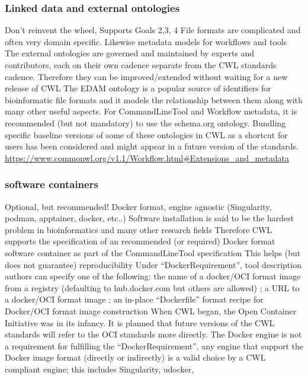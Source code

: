 \subsubsection{Linked data and external ontologies}

Don’t reinvent the wheel, Supports Goals 2,3, 4
File formats are complicated and often very domain specific. Likewise metadata models for workflows and tools
The external ontologies are governed and maintained by experts and contributors, each on their own cadence separate from the CWL standards cadence. Therefore they can be improved/extended without waiting for a new release of CWL
The EDAM ontology is a popular source of identifiers for bioinformatic file formats and it models the relationship between them along with many other useful aspects. For CommandLineTool and Workflow metadata, it is recommended (but not mandatory) to use the schema.org ontology.
Bundling specific baseline versions of some of these ontologies in CWL as a shortcut for users has been considered and might appear in a future version of the standards.
\url{https://www.commonwl.org/v1.1/Workflow.html#Extensions_and_metadata}

\subsubsection{software containers}
Optional, but recommended! Docker format, engine agnostic (Singularity, podman, apptainer, docker, etc..)
Software installation is said to be the hardest problem in bioinformatics and many other research fields
Therefore CWL supports the specification of an recommended (or required) Docker format software container as part of the CommandLineTool specification
This helps (but does not guarantee) reproducibility
Under “DockerRequirement”, tool description authors can specify one of the following: the name of a docker/OCI format image from a registry (defaulting to hub.docker.com but others are allowed) ; a URL to a docker/OCI format image ; an in-place “Dockerfile” format recipe for Docker/OCI format image construction
When CWL began, the Open Container Initiative was in its infancy. It is planned that future versions of the CWL standards will refer to the OCI standards more directly. The Docker engine is not a requirement for fulfilling the “DockerRequirement”, any engine that support the Docker image format (directly or indirectly) is a valid choice by a CWL compliant engine; this includes Singularity, udocker,
